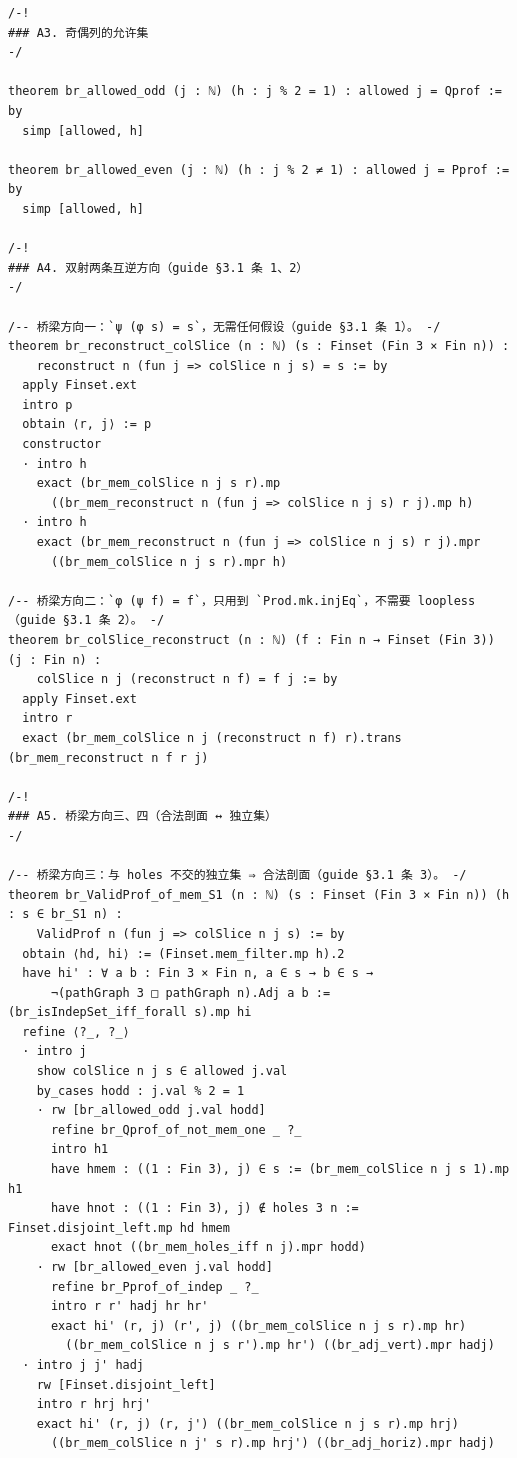 \documentclass[11pt]{article}
\begin{document}
\begin{lstlisting}
/-!
### A3. 奇偶列的允许集
-/

theorem br_allowed_odd (j : ℕ) (h : j % 2 = 1) : allowed j = Qprof := by
  simp [allowed, h]

theorem br_allowed_even (j : ℕ) (h : j % 2 ≠ 1) : allowed j = Pprof := by
  simp [allowed, h]

/-!
### A4. 双射两条互逆方向（guide §3.1 条 1、2）
-/

/-- 桥梁方向一：`ψ (φ s) = s`，无需任何假设（guide §3.1 条 1）。 -/
theorem br_reconstruct_colSlice (n : ℕ) (s : Finset (Fin 3 × Fin n)) :
    reconstruct n (fun j => colSlice n j s) = s := by
  apply Finset.ext
  intro p
  obtain ⟨r, j⟩ := p
  constructor
  · intro h
    exact (br_mem_colSlice n j s r).mp
      ((br_mem_reconstruct n (fun j => colSlice n j s) r j).mp h)
  · intro h
    exact (br_mem_reconstruct n (fun j => colSlice n j s) r j).mpr
      ((br_mem_colSlice n j s r).mpr h)

/-- 桥梁方向二：`φ (ψ f) = f`，只用到 `Prod.mk.injEq`，不需要 loopless（guide §3.1 条 2）。 -/
theorem br_colSlice_reconstruct (n : ℕ) (f : Fin n → Finset (Fin 3)) (j : Fin n) :
    colSlice n j (reconstruct n f) = f j := by
  apply Finset.ext
  intro r
  exact (br_mem_colSlice n j (reconstruct n f) r).trans (br_mem_reconstruct n f r j)

/-!
### A5. 桥梁方向三、四（合法剖面 ↔ 独立集）
-/

/-- 桥梁方向三：与 holes 不交的独立集 ⇒ 合法剖面（guide §3.1 条 3）。 -/
theorem br_ValidProf_of_mem_S1 (n : ℕ) (s : Finset (Fin 3 × Fin n)) (h : s ∈ br_S1 n) :
    ValidProf n (fun j => colSlice n j s) := by
  obtain ⟨hd, hi⟩ := (Finset.mem_filter.mp h).2
  have hi' : ∀ a b : Fin 3 × Fin n, a ∈ s → b ∈ s →
      ¬(pathGraph 3 □ pathGraph n).Adj a b := (br_isIndepSet_iff_forall s).mp hi
  refine ⟨?_, ?_⟩
  · intro j
    show colSlice n j s ∈ allowed j.val
    by_cases hodd : j.val % 2 = 1
    · rw [br_allowed_odd j.val hodd]
      refine br_Qprof_of_not_mem_one _ ?_
      intro h1
      have hmem : ((1 : Fin 3), j) ∈ s := (br_mem_colSlice n j s 1).mp h1
      have hnot : ((1 : Fin 3), j) ∉ holes 3 n := Finset.disjoint_left.mp hd hmem
      exact hnot ((br_mem_holes_iff n j).mpr hodd)
    · rw [br_allowed_even j.val hodd]
      refine br_Pprof_of_indep _ ?_
      intro r r' hadj hr hr'
      exact hi' (r, j) (r', j) ((br_mem_colSlice n j s r).mp hr)
        ((br_mem_colSlice n j s r').mp hr') ((br_adj_vert).mpr hadj)
  · intro j j' hadj
    rw [Finset.disjoint_left]
    intro r hrj hrj'
    exact hi' (r, j) (r, j') ((br_mem_colSlice n j s r).mp hrj)
      ((br_mem_colSlice n j' s r).mp hrj') ((br_adj_horiz).mpr hadj)


\end{lstlisting}
\end{document}
